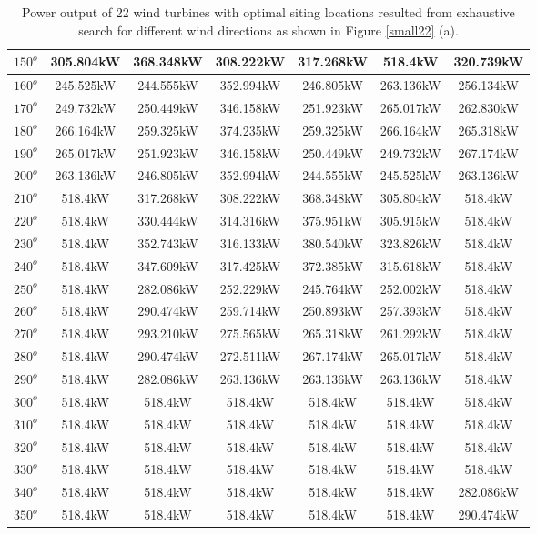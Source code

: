 \begin{table}[H]
\begin{tabular}{|c|c|c|c|c|c|c|}
		$150^o$	& 305.804kW	& 368.348kW	& 308.222kW	& 317.268kW	& 518.4kW	& 320.739kW	\\ \hline
		$160^o$	& 245.525kW	& 244.555kW	& 352.994kW	& 246.805kW	& 263.136kW	& 256.134kW	\\ \hline
		$170^o$	& 249.732kW	& 250.449kW	& 346.158kW	& 251.923kW	& 265.017kW	& 262.830kW	\\ \hline
		$180^o$	& 266.164kW	& 259.325kW	& 374.235kW	& 259.325kW	& 266.164kW	& 265.318kW	\\ \hline
		$190^o$	& 265.017kW	& 251.923kW	& 346.158kW	& 250.449kW	& 249.732kW	& 267.174kW	\\ \hline
		$200^o$	& 263.136kW	& 246.805kW	& 352.994kW	& 244.555kW	& 245.525kW	& 263.136kW	\\ \hline
		$210^o$	& 518.4kW	& 317.268kW	& 308.222kW	& 368.348kW	& 305.804kW	& 518.4kW	\\ \hline
		$220^o$	& 518.4kW	& 330.444kW	& 314.316kW	& 375.951kW	& 305.915kW	& 518.4kW	\\ \hline
		$230^o$	& 518.4kW	& 352.743kW	& 316.133kW	& 380.540kW	& 323.826kW	& 518.4kW	\\ \hline
		$240^o$	& 518.4kW	& 347.609kW	& 317.425kW	& 372.385kW	& 315.618kW	& 518.4kW	\\ \hline
		$250^o$	& 518.4kW	& 282.086kW	& 252.229kW	& 245.764kW	& 252.002kW	& 518.4kW	\\ \hline
		$260^o$	& 518.4kW	& 290.474kW	& 259.714kW	& 250.893kW	& 257.393kW	& 518.4kW	\\ \hline
		$270^o$	& 518.4kW	& 293.210kW	& 275.565kW	& 265.318kW	& 261.292kW	& 518.4kW	\\ \hline
		$280^o$	& 518.4kW	& 290.474kW	& 272.511kW	& 267.174kW	& 265.017kW	& 518.4kW	\\ \hline
		$290^o$	& 518.4kW	& 282.086kW	& 263.136kW	& 263.136kW	& 263.136kW	& 518.4kW	\\ \hline
		$300^o$	& 518.4kW	& 518.4kW	& 518.4kW	& 518.4kW	& 518.4kW	& 518.4kW	\\ \hline
		$310^o$	& 518.4kW	& 518.4kW	& 518.4kW	& 518.4kW	& 518.4kW	& 518.4kW	\\ \hline
		$320^o$	& 518.4kW	& 518.4kW	& 518.4kW	& 518.4kW	& 518.4kW	& 518.4kW	\\ \hline
		$330^o$	& 518.4kW	& 518.4kW	& 518.4kW	& 518.4kW	& 518.4kW	& 518.4kW	\\ \hline
		$340^o$	& 518.4kW	& 518.4kW	& 518.4kW	& 518.4kW	& 518.4kW	& 282.086kW	\\ \hline
		$350^o$	& 518.4kW	& 518.4kW	& 518.4kW	& 518.4kW	& 518.4kW	& 290.474kW	\\ \hline
        	\end{tabular}
        	\caption{Power output of 22 wind turbines with optimal siting locations resulted from exhaustive search for different wind directions as shown in Figure \ref{small22} (a).}
        	\label{table22a}
        \end{table}
